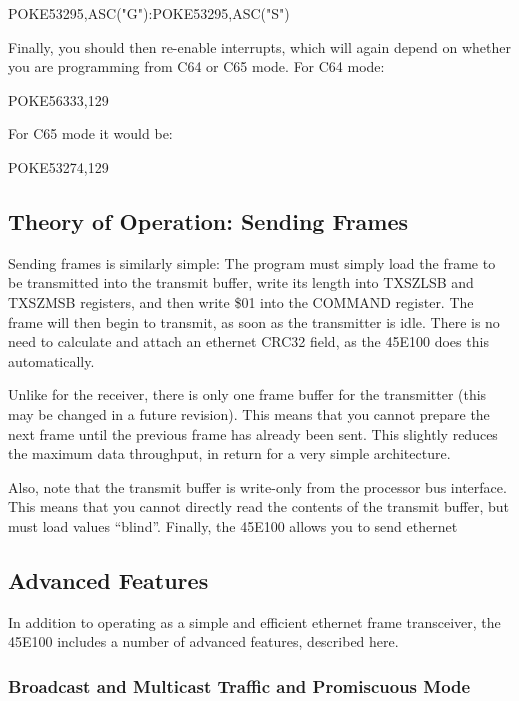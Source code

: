 \begin{screenoutput}
POKE53295,ASC("G"):POKE53295,ASC("S")
\end{screenoutput}

Finally, you should then re-enable interrupts, which will again depend on whether you are programming from C64 or C65 mode.  For C64 mode:

\begin{screenoutput}
POKE56333,129
\end{screenoutput}

For C65 mode it would be:

\begin{screenoutput}
POKE53274,129
\end{screenoutput}



\subsection{Theory of Operation: Sending Frames}

Sending frames is similarly simple: The program must simply load the frame to be transmitted into
the transmit buffer, write its length into TXSZLSB and TXSZMSB registers, and then write \$01 into
the COMMAND register.  The frame will then begin to transmit, as soon as the transmitter is idle.
There is no need to calculate and attach an ethernet CRC32 field, as the 45E100 does this automatically.

Unlike for the receiver, there is only one frame buffer for the transmitter (this may be changed in
a future revision). This means that you cannot prepare the next frame until the previous frame has
already been sent.  This slightly reduces the maximum data throughput, in return for a very simple
architecture.

Also, note that the transmit buffer is write-only from the processor bus interface. This means that
you cannot directly read the contents of the transmit buffer, but must load values ``blind''.  Finally,
the 45E100 allows you to send ethernet

\subsection{Advanced Features}

In addition to operating as a simple and efficient ethernet frame transceiver, the 45E100
includes a number of advanced features, described here.

\subsubsection{Broadcast and Multicast Traffic and Promiscuous Mode}

